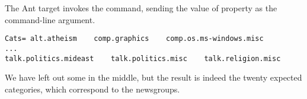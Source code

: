 The Ant target  invokes the
 command, sending the value of property
 as the command-line argument.
%
\begin{verbatim}
Cats= alt.atheism    comp.graphics    comp.os.ms-windows.misc
...
talk.politics.mideast    talk.politics.misc    talk.religion.misc
\end{verbatim}
%
We have left out some in the middle, but the result is indeed the
twenty expected categories, which correspond to the newsgroups.




